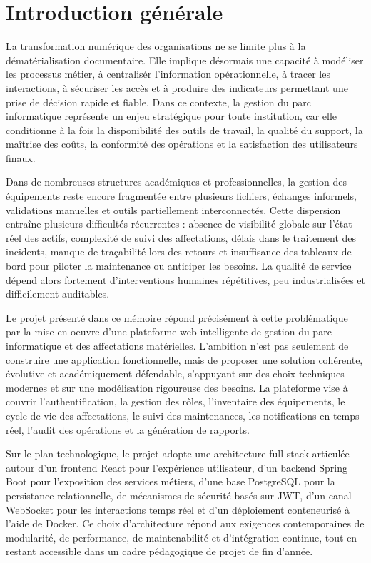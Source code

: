 ﻿\documentclass[12pt,a4paper,oneside]{report}
\begin{document}
\clearpage
{}


\chapter*{Introduction générale}

La transformation numérique des organisations ne se limite plus à la dématérialisation documentaire. Elle implique désormais une capacité à modéliser les processus métier, à centralisér l'information opérationnelle, à tracer les interactions, à sécuriser les accès et à produire des indicateurs permettant une prise de décision rapide et fiable. Dans ce contexte, la gestion du parc informatique représente un enjeu stratégique pour toute institution, car elle conditionne à la fois la disponibilité des outils de travail, la qualité du support, la maîtrise des coûts, la conformité des opérations et la satisfaction des utilisateurs finaux.

Dans de nombreuses structures académiques et professionnelles, la gestion des équipements reste encore fragmentée entre plusieurs fichiers, échanges informels, validations manuelles et outils partiellement interconnectés. Cette dispersion entraîne plusieurs difficultés récurrentes : absence de visibilité globale sur l'état réel des actifs, complexité de suivi des affectations, délais dans le traitement des incidents, manque de traçabilité lors des retours et insuffisance des tableaux de bord pour piloter la maintenance ou anticiper les besoins. La qualité de service dépend alors fortement d'interventions humaines répétitives, peu industrialisées et difficilement auditables.

Le projet présenté dans ce mémoire répond précisément à cette problématique par la mise en oeuvre d'une plateforme web intelligente de gestion du parc informatique et des affectations matérielles. L'ambition n'est pas seulement de construire une application fonctionnelle, mais de proposer une solution cohérente, évolutive et académiquement défendable, s'appuyant sur des choix techniques modernes et sur une modélisation rigoureuse des besoins. La plateforme vise à couvrir l'authentification, la gestion des rôles, l'inventaire des équipements, le cycle de vie des affectations, le suivi des maintenances, les notifications en temps réel, l'audit des opérations et la génération de rapports.

Sur le plan technologique, le projet adopte une architecture full-stack articulée autour d'un frontend React pour l'expérience utilisateur, d'un backend Spring Boot pour l'exposition des services métiers, d'une base PostgreSQL pour la persistance relationnelle, de mécanismes de sécurité basés sur JWT, d'un canal WebSocket pour les interactions temps réel et d'un déploiement conteneurisé à l'aide de Docker. Ce choix d'architecture répond aux exigences contemporaines de modularité, de performance, de maintenabilité et d'intégration continue, tout en restant accessible dans un cadre pédagogique de projet de fin d'année.
\end{document}
